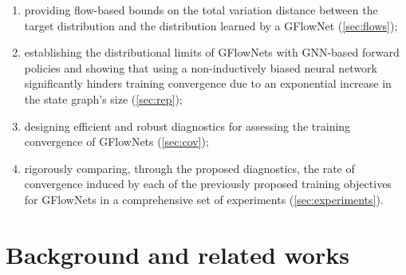 \documentclass{article}
\theoremstyle{plain}
\theoremstyle{definition}
\theoremstyle{remark}
\theoremstyle{remark}
\begin{document}
\begin{enumerate} 
    \item providing flow-based bounds on the total variation distance between the target distribution and the distribution learned by a GFlowNet (\autoref{sec:flows}); %
    \item establishing the distributional limits of GFlowNets with GNN-based forward policies and showing that using a non-inductively biased neural network significantly hinders training convergence due to an exponential  increase in the state graph's size (\autoref{sec:rep}); 
    \item designing efficient and robust diagnostics for assessing the training convergence of GFlowNets (\autoref{sec:cov}); 
    \item rigorously comparing, through the proposed diagnostics, the rate of convergence induced by each of the previously proposed training objectives for GFlowNets in a comprehensive set of experiments (\autoref{sec:experiments}).        
\end{enumerate} 

\newpage 


\section{Background and related works} 
\end{document}
